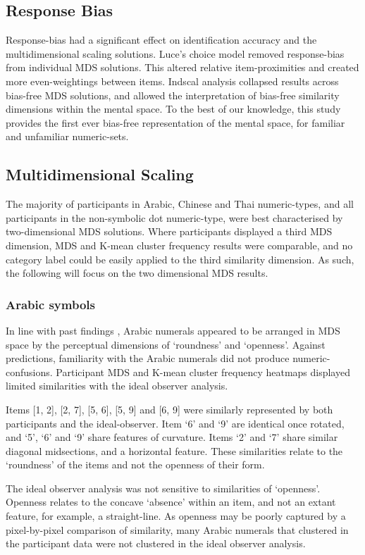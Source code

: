 \subsection{Response Bias}
Response-bias had a significant effect on identification accuracy and the multidimensional scaling solutions. Luce's choice model removed response-bias from individual MDS solutions. This altered relative item-proximities and created more even-weightings between items. Indscal analysis collapsed results across bias-free MDS solutions, and allowed the interpretation of bias-free similarity dimensions within the mental space. To the best of our knowledge, this study provides the first ever bias-free representation of the mental space, for familiar and unfamiliar numeric-sets.

\subsection{Multidimensional Scaling}
The majority of participants in Arabic, Chinese and Thai numeric-types, and all participants in the non-symbolic dot numeric-type, were best characterised by two-dimensional MDS solutions. Where participants displayed a third MDS dimension, MDS and K-mean cluster frequency results were comparable, and no category label could be easily applied to the third similarity dimension. As such, the following will focus on the two dimensional MDS results.

\subsubsection{Arabic symbols}
In line with past findings \cite{godwin2014numSim}, Arabic numerals appeared to be arranged in MDS space by the perceptual dimensions of `roundness' and `openness'. Against predictions, familiarity with the Arabic numerals did not produce numeric-confusions. Participant MDS and K-mean cluster frequency heatmaps displayed limited similarities with the ideal observer analysis.

Items [1, 2], [2, 7], [5, 6], [5, 9] and [6, 9] were similarly represented by both participants and the ideal-observer. Item `6’ and `9’ are identical once rotated, and `5’, `6' and `9' share features of curvature. Items `2’ and `7’ share similar diagonal midsections, and a horizontal feature. These similarities relate to the `roundness' of the items and not the openness of their form. 

The ideal observer analysis was not sensitive to similarities of `openness’. Openness relates to the concave `absence’ within an item, and not an extant feature, for example, a straight-line. As openness may be poorly captured by a pixel-by-pixel comparison of similarity, many Arabic numerals that clustered in the participant data were not clustered in the ideal observer analysis.

